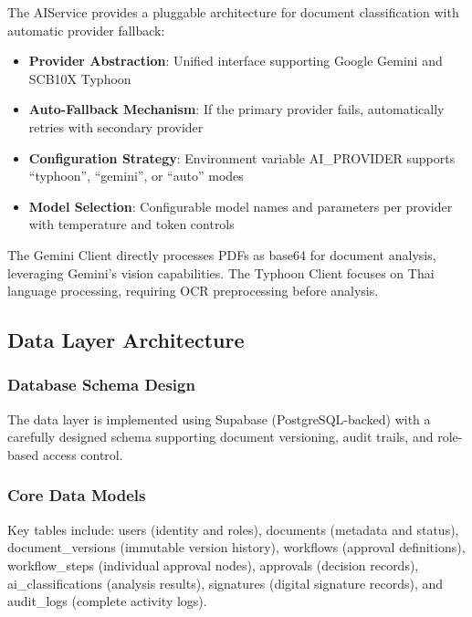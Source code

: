 \documentclass[12pt,oneside,openright,a4paper]{cpe-english-project}
\begin{document}
The AIService provides a pluggable architecture for document classification with automatic provider fallback:

\begin{itemize}
    \item \textbf{Provider Abstraction}: Unified interface supporting Google Gemini and SCB10X Typhoon
    \item \textbf{Auto-Fallback Mechanism}: If the primary provider fails, automatically retries with secondary provider
    \item \textbf{Configuration Strategy}: Environment variable AI\_PROVIDER supports ``typhoon'', ``gemini'', or ``auto'' modes
    \item \textbf{Model Selection}: Configurable model names and parameters per provider with temperature and token controls
\end{itemize}

The Gemini Client directly processes PDFs as base64 for document analysis, leveraging Gemini's vision capabilities. The Typhoon Client focuses on Thai language processing, requiring OCR preprocessing before analysis.

\vspace{1em}

\subsection{Data Layer Architecture}

\subsubsection{Database Schema Design}

The data layer is implemented using Supabase (PostgreSQL-backed) with a carefully designed schema supporting document versioning, audit trails, and role-based access control.

\subsubsection{Core Data Models}

Key tables include: users (identity and roles), documents (metadata and status), document\_versions (immutable version history), workflows (approval definitions), workflow\_steps (individual approval nodes), approvals (decision records), ai\_classifications (analysis results), signatures (digital signature records), and audit\_logs (complete activity logs).
\end{document}
